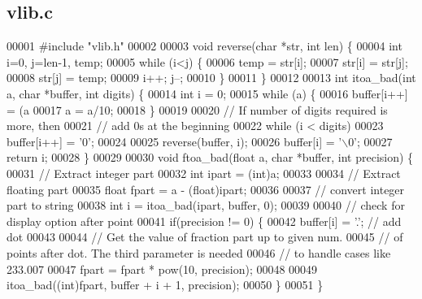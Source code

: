 \subsection{vlib.\+c}
\label{vlib_8c_source}

\begin{DoxyCode}
00001 \textcolor{preprocessor}{#include "vlib.h"}
00002 
00003 \textcolor{keywordtype}{void} reverse(\textcolor{keywordtype}{char} *str, \textcolor{keywordtype}{int} len) \{
00004     \textcolor{keywordtype}{int} i=0, j=len-1, temp;
00005     \textcolor{keywordflow}{while} (i<j) \{
00006         temp = str[i];
00007         str[i] = str[j];
00008         str[j] = temp;
00009         i++; j--;
00010     \}
00011 \}
00012 
00013 \textcolor{keywordtype}{int} itoa_bad(\textcolor{keywordtype}{int} a, \textcolor{keywordtype}{char} *buffer, \textcolor{keywordtype}{int} digits) \{
00014   \textcolor{keywordtype}{int} i = 0;
00015    \textcolor{keywordflow}{while} (a) \{
00016        buffer[i++] = (a%
00017        a = a/10;
00018    \}
00019 
00020    \textcolor{comment}{// If number of digits required is more, then}
00021    \textcolor{comment}{// add 0s at the beginning}
00022    \textcolor{keywordflow}{while} (i < digits)
00023        buffer[i++] = \textcolor{charliteral}{'0'};
00024 
00025    reverse(buffer, i);
00026    buffer[i] = \textcolor{charliteral}{'\(\backslash\)0'};
00027    \textcolor{keywordflow}{return} i;
00028 \}
00029 
00030 \textcolor{keywordtype}{void} ftoa_bad(\textcolor{keywordtype}{float} a, \textcolor{keywordtype}{char} *buffer, \textcolor{keywordtype}{int} precision) \{
00031   \textcolor{comment}{// Extract integer part}
00032   \textcolor{keywordtype}{int} ipart = (int)a;
00033 
00034   \textcolor{comment}{// Extract floating part}
00035   \textcolor{keywordtype}{float} fpart = a - (float)ipart;
00036 
00037   \textcolor{comment}{// convert integer part to string}
00038   \textcolor{keywordtype}{int} i = itoa_bad(ipart, buffer, 0);
00039 
00040   \textcolor{comment}{// check for display option after point}
00041   \textcolor{keywordflow}{if}(precision != 0) \{
00042     buffer[i] = \textcolor{charliteral}{'.'};  \textcolor{comment}{// add dot}
00043 
00044     \textcolor{comment}{// Get the value of fraction part up to given num.}
00045     \textcolor{comment}{// of points after dot. The third parameter is needed}
00046     \textcolor{comment}{// to handle cases like 233.007}
00047     fpart = fpart * pow(10, precision);
00048 
00049     itoa_bad((\textcolor{keywordtype}{int})fpart, buffer + i + 1, precision);
00050   \}
00051 \}
\end{DoxyCode}

